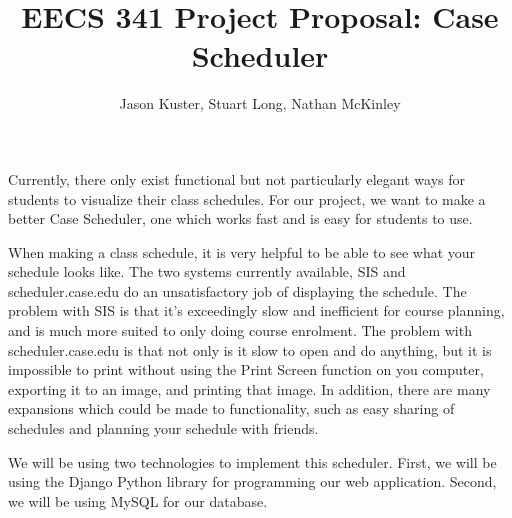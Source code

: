\documentclass[12pt]{article}
\begin{document}
\title{EECS 341 Project Proposal: Case Scheduler}
\author{Jason Kuster, Stuart Long, Nathan McKinley}
\maketitle

Currently, there only exist functional but not particularly elegant ways for students to visualize their class schedules. For our project, we want to make a better Case Scheduler, one which works fast and is easy for students to use.

When making a class schedule, it is very helpful to be able to see what your schedule looks like. The two systems currently available, SIS and scheduler.case.edu do an unsatisfactory job of displaying the schedule. The problem with SIS is that it's exceedingly slow and inefficient for course planning, and is much more suited to only doing course enrolment. The problem with scheduler.case.edu is that not only is it slow to open and do anything, but it is impossible to print without using the Print Screen function on you computer, exporting it to an image, and printing that image. In addition, there are many expansions which could be made to functionality, such as easy sharing of schedules and planning your schedule with friends.

We will be using two technologies to implement this scheduler. First, we will be using the Django Python library for programming our web application. Second, we will be using MySQL for our database.
\end{document}
